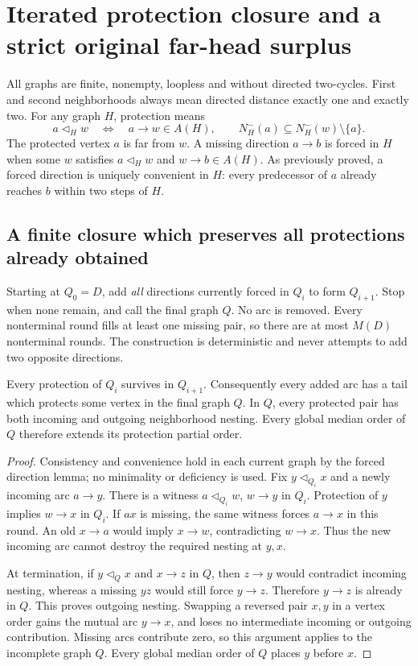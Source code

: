 \section{Iterated protection closure and a strict original far-head surplus}
\label{sec:iterated-protection-closure-strict-surplus}

All graphs are finite, nonempty, loopless and without directed two-cycles.
First and second neighborhoods always mean directed distance exactly one
and exactly two. For any graph $H$, protection means
\[
 a\triangleleft_H w \quad\Longleftrightarrow\quad
 a\to w\in A(H),\qquad
 N_H^-(a)\subseteq N_H^-(w)\setminus\{a\}.
\]
The protected vertex $a$ is far from $w$. A missing direction $a\to b$
is forced in $H$ when some $w$ satisfies $a\triangleleft_H w$ and
$w\to b\in A(H)$. As previously proved, a forced direction is uniquely
convenient in $H$: every predecessor of $a$ already reaches $b$ within
two steps of $H$.

\subsection{A finite closure which preserves all protections already obtained}

Starting at $Q_0=D$, add \emph{all} directions currently forced in $Q_i$
to form $Q_{i+1}$. Stop when none remain, and call the final graph $Q$.
No arc is removed. Every nonterminal round fills at least one missing
pair, so there are at most $M(D)$ nonterminal rounds. The construction is
deterministic and never attempts to add two opposite directions.

\begin{lemma}
\label{lem:iterated-closure-monotone-protection}
Every protection of $Q_i$ survives in $Q_{i+1}$. Consequently every added
arc has a tail which protects some vertex in the final graph $Q$.
In $Q$, every protected pair has both incoming and outgoing neighborhood
nesting. Every global median order of $Q$ therefore extends its protection
partial order.
\end{lemma}
\begin{proof}
Consistency and convenience hold in each current graph by the forced
direction lemma; no minimality or deficiency is used.
Fix $y\triangleleft_{Q_i}x$ and a newly incoming arc $a\to y$.
There is a witness $a\triangleleft_{Q_i}w$, $w\to y$ in $Q_i$.
Protection of $y$ implies $w\to x$ in $Q_i$. If $ax$ is missing,
the same witness forces $a\to x$ in this round. An old $x\to a$
would imply $x\to w$, contradicting $w\to x$. Thus the new incoming
arc cannot destroy the required nesting at $y,x$.

At termination, if $y\triangleleft_Q x$ and $x\to z$ in $Q$, then
$z\to y$ would contradict incoming nesting, whereas a missing $yz$
would still force $y\to z$. Therefore $y\to z$ is already in $Q$.
This proves outgoing nesting. Swapping a reversed pair $x,y$ in a
vertex order gains the mutual arc $y\to x$, and loses no intermediate
incoming or outgoing contribution. Missing arcs contribute zero, so
this argument applies to the incomplete graph $Q$. Every global
median order of $Q$ places $y$ before $x$.
\end{proof}

